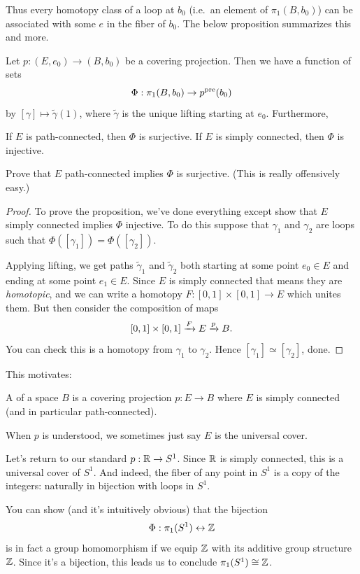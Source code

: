 Thus every homotopy class of a loop at $b_0$ (i.e.\ an element of $\pi_1(B, b_0)$) can be associated with some $e$ in the fiber of $b_0$.
The below proposition summarizes this and more.
\begin{proposition}
	Let $p : (E,e_0) \to (B,b_0)$ be a covering projection.
	Then we have a function of sets
	\[ \Phi : \pi_1(B, b_0) \to p^{\text{pre}}(b_0) \]
	by $[\gamma] \mapsto \tilde\gamma(1)$, where $\tilde\gamma$
	is the unique lifting starting at $e_0$.
	Furthermore,
	\begin{itemize}
		\ii If $E$ is path-connected, then $\Phi$ is surjective.
		\ii If $E$ is simply connected, then $\Phi$ is injective.
	\end{itemize}
\end{proposition}
\begin{ques}
	Prove that $E$ path-connected implies $\Phi$ is surjective.
	(This is really offensively easy.)
\end{ques}
\begin{proof}
	To prove the proposition, we've done everything except show
	that $E$ simply connected implies $\Phi$ injective.
	To do this suppose that $\gamma_1$ and $\gamma_2$ are loops
	such that $\Phi([\gamma_1]) = \Phi([\gamma_2])$.

	Applying lifting, we get paths $\tilde\gamma_1$ and $\tilde\gamma_2$
	both starting at some point $e_0 \in E$ and ending at some point $e_1 \in E$.
	Since $E$ is simply connected that means they are \emph{homotopic},
	and we can write a homotopy $F : [0,1] \times [0,1] \to E$
	which unites them.
	But then consider the composition of maps
	\[ [0,1] \times [0,1] \xrightarrow{F} E \xrightarrow{p} B. \]
	You can check this is a homotopy from $\gamma_1$ to $\gamma_2$.
	Hence $[\gamma_1] \simeq [\gamma_2]$, done.
\end{proof}

This motivates:
\begin{definition}
	A  of a space $B$ is a covering projection
	$p : E \to B$ where $E$ is simply connected (and in particular path-connected).
\end{definition}
\begin{abuse}
	When $p$ is understood, we sometimes just say $E$ is the universal cover.
\end{abuse}

\begin{example}
	Let's return to our standard $p : \mathbb R \to S^1$.
	Since $\mathbb R$ is simply connected, this is a universal cover of $S^1$.
	And indeed, the fiber of any point in $S^1$
	is a copy of the integers: naturally in bijection with loops in $S^1$.
	
	You can show (and it's intuitively obvious) that the bijection
	\[ \Phi : \pi_1(S^1) \leftrightarrow \mathbb Z \]
	is in fact a group homomorphism if we equip $\mathbb Z$ with its
	additive group structure $\mathbb Z$.
	Since it's a bijection, this leads us to conclude $\pi_1(S^1) \cong \mathbb Z$.
\end{example}

